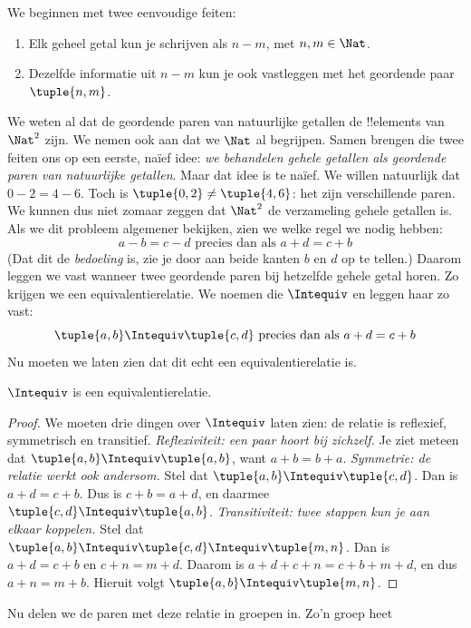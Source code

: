\documentclass[../../../include/open-logic-section]{subfiles}
\begin{document}
We beginnen met twee eenvoudige feiten:
	\begin{enumerate}
		\item Elk geheel getal kun je schrijven als $n - m$, met $n, m \in\Nat$.
		\item Dezelfde informatie uit $n - m$ kun je ook vastleggen met het geordende paar $\tuple{n, m}$.
	\end{enumerate}
We weten al dat de geordende paren van natuurlijke getallen de !!{element}s
van $\Nat^2$ zijn. We nemen ook aan dat we $\Nat$ al begrijpen. Samen
brengen die twee feiten ons op een eerste, na\"{i}ef idee: \emph{we behandelen gehele
getallen als geordende paren van natuurlijke getallen}.
Maar dat idee is te na\"{i}ef. We willen natuurlijk dat $0- 2 = 4 -
6$. Toch is $\tuple{0, 2 }\neq \tuple{4, 6}$: het zijn verschillende
paren. We kunnen dus niet zomaar zeggen dat $\Nat^2$ de verzameling
gehele getallen is.
Als we dit probleem algemener bekijken, zien we welke regel we nodig hebben:
	$$a - b = c - d \text{ precies dan als }a + d = c + b$$
(Dat dit de \emph{bedoeling} is, zie je door aan beide kanten $b$ en $d$ op
te tellen.) Daarom leggen we vast wanneer twee geordende paren bij
hetzelfde gehele getal horen. Zo krijgen we een equivalentierelatie. We noemen
die $\Intequiv$ en leggen haar zo vast:
$$\tuple{ a, b } \Intequiv \tuple{c, d}\text{ precies dan als }a + d = c + b$$
Nu moeten we laten zien dat dit echt een equivalentierelatie is.
\begin{prop} $\Intequiv$ is een equivalentierelatie.
\end{prop}
	\begin{proof}
	We moeten drie dingen over $\Intequiv$ laten zien: de relatie is
	reflexief, symmetrisch en transitief.
	\emph{Reflexiviteit: een paar hoort bij zichzelf.} Je ziet meteen dat
	$\tuple{a, b} \Intequiv \tuple{a, b}$, want $a + b = b + a$.
	\emph{Symmetrie: de relatie werkt ook andersom.} Stel dat $\tuple{a,
	b} \Intequiv \tuple{c, d}$. Dan is $a + d = c + b$. Dus is $c + b =
	a + d$, en daarmee $\tuple{c, d} \Intequiv \tuple{a, b}$.
	\emph{Transitiviteit: twee stappen kun je aan elkaar koppelen.} Stel
	dat $\tuple{a, b} \Intequiv \tuple{c, d}\Intequiv \tuple{m, n}$.
	Dan is $a + d = c + b$ en $c + n = m + d$. Daarom is $a + d + c +
	n = c + b + m + d$, en dus $a + n = m + b$. Hieruit volgt
	$\tuple{a, b } \Intequiv \tuple{m, n}$.
\end{proof}
Nu delen we de paren met deze relatie in groepen in. Zo'n groep heet
\end{document}

